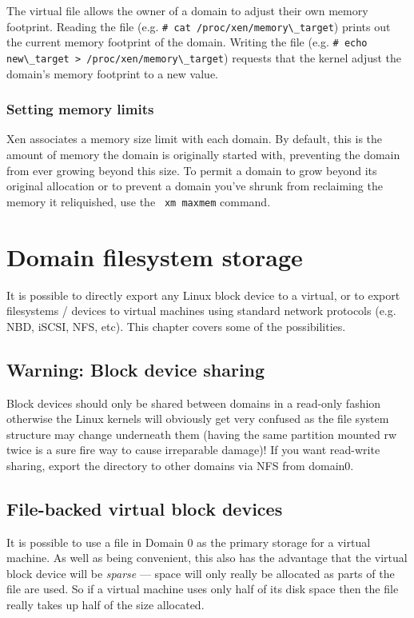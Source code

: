 \documentclass[11pt,twoside,final,openright]{xenstyle}
\begin{document}
The virtual file  allows the owner of a
domain to adjust their own memory footprint.  Reading the file
(e.g. \verb!# cat /proc/xen/memory\_target!) prints out the current
memory footprint of the domain.  Writing the file
(e.g. \verb!# echo new\_target > /proc/xen/memory\_target!) requests
that the kernel adjust the domain's memory footprint to a new value.

\subsection{Setting memory limits}

Xen associates a memory size limit with each domain.  By default, this
is the amount of memory the domain is originally started with,
preventing the domain from ever growing beyond this size.  To permit a
domain to grow beyond its original allocation or to prevent a domain
you've shrunk from reclaiming the memory it reliquished, use the {\tt
xm maxmem} command.

\chapter{Domain filesystem storage}

It is possible to directly export any Linux block device to a virtual,
or to export filesystems / devices to virtual machines using standard
network protocols (e.g. NBD, iSCSI, NFS, etc).  This chapter covers
some of the possibilities.

\section{Warning: Block device sharing}

Block devices should only be shared between domains in a read-only
fashion otherwise the Linux kernels will obviously get very confused
as the file system structure may change underneath them (having the
same partition mounted rw twice is a sure fire way to cause
irreparable damage)!  If you want read-write sharing, export the
directory to other domains via NFS from domain0.

\section{File-backed virtual block devices}

It is possible to use a file in Domain 0 as the primary storage for a
virtual machine.  As well as being convenient, this also has the
advantage that the virtual block device will be {\em sparse} --- space
will only really be allocated as parts of the file are used.  So if a
virtual machine uses only half of its disk space then the file really
takes up half of the size allocated.
\end{document}
